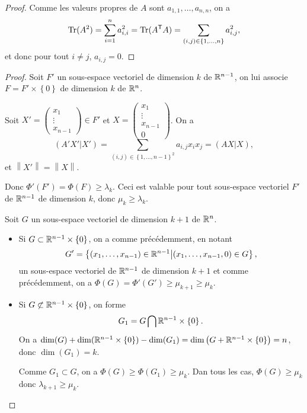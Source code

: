 \documentclass[12pt]{article}
\begin{document}
\begin{proof}
	Comme les valeurs propres de $A$ sont $a_{1,1},\dots,a_{n,n}$, on a
	\begin{equation}
		\operatorname{Tr}(A^{2})=\sum_{i=1}^{n}a_{i,i}^{2}=\operatorname{Tr}(A^{\mathsf{T}}A)=\sum_{(i,j)\in\left\lbrace1,\dots,n\right\rbrace}a_{i,j}^{2},
	\end{equation}
	et donc pour tout $i\neq j$, $a_{i,j}=0$.
\end{proof}

\begin{proof}
	Soit $F'$ un sous-espace vectoriel de dimension $k$ de $\mathbb{R}^{n-1}$, on lui associe $F=F'\times\left\lbrace0\right\rbrace$ de dimension $k$ de $\mathbb{R}^{n}$.

	Soit $X'=\begin{pmatrix}
		x_1\\\vdots\\x_{n-1}
	\end{pmatrix}\in F'$ et $X=\begin{pmatrix}
		x_1\\\vdots\\x_{n-1}\\0
	\end{pmatrix}$. On a 
	\begin{equation}
		(A'X'|X')=\sum_{(i,j)\in\left\lbrace1,\dots,n-1\right\rbrace^{2}}a_{i,j}x_{i}x_{j}=(AX|X),
	\end{equation}
	et $\left\lVert X'\right\rVert=\left\lVert X\right\rVert$.

	Donc $\Phi'(F')=\Phi(F)\geqslant\lambda_{k}$. Ceci est valable pour tout sous-espace vectoriel $F'$ de $\mathbb{R}^{n-1}$ de dimension $k$, donc $\mu_k\geqslant\lambda_k$.

	Soit $G$ un sous-espace vectoriel de dimension $k+1$ de $\mathbb{R}^{n}$. 
	\begin{itemize}
		\item Si $G\subset\mathbb{R}^{n-1}\times\left\lbrace0\right\rbrace$, on a comme précédemment, en notant 
		\begin{equation}
			G'=\left\lbrace(x_1,\dots,x_{n-1})\in\mathbb{R}^{n-1}\middle|(x_1,\dots,x_{n-1},0)\in G\right\rbrace,	
		\end{equation}
		un sous-espace vectoriel de $\mathbb{R}^{n-1}$ de dimension $k+1$ et comme précédemment, on a $\Phi(G)=\Phi'(G')\geqslant\mu_{k+1}\geqslant\mu_k$.
		\item Si $G\not\subset\mathbb{R}^{n-1}\times\left\lbrace0\right\rbrace$, on forme 
		\begin{equation}
			G_1=G\bigcap\mathbb{R}^{n-1}\times\left\lbrace0\right\rbrace.
		\end{equation}
		On a $\dim(G)+\dim(\mathbb{R}^{n-1}\times\left\lbrace0\right\rbrace)-\dim(G_1)=\dim\left(G+\mathbb{R}^{n-1}\times\left\lbrace0\right\rbrace\right)=n$, donc $\dim(G_1)=k$.

		Comme $G_1\subset G$, on a $\Phi(G)\geqslant\Phi(G_1)\geqslant\mu_k$. Dan tous les cas, $\Phi(G)\geqslant\mu_k$ donc $\lambda_{k+1}\geqslant\mu_k$.
	\end{itemize}
\end{proof}
\end{document}
